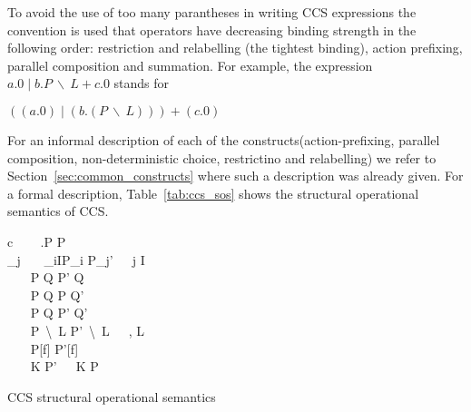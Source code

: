 	To avoid the use of too many parantheses in writing CCS expressions 
	the convention is used that operators have decreasing binding strength in 
	the following order: restriction and relabelling (the tightest binding), 
	action prefixing, parallel composition and summation. For example, the 
	expression $a.0 \mid b.P\ \backslash\ L + c.0$ stands for
		
	\begin{center}$((a.0) \mid (b.(P\ \backslash\ L))) + (c.0)$\end{center}
		
	For an informal description of each of the constructs(action-prefixing, 
	parallel composition, non-deterministic choice, restrictino and relabelling) 
	we refer to Section~\ref{sec:common_constructs} where such a description was 
	already given. For a formal description, Table~\ref{tab:ccs_sos} shows the 
	structural operational semantics of CCS.


\begin{table}[t]
\begin{ARRAY}{c}
	\ \ \ \Inference{                              }
	                            {\alpha.P \infarrow{\alpha} P} \vspace{10pt}\\
	_j\ \ \ 
	                              {\sum_{i\in I}P_i \infarrow{\alpha} P_j'}\ \ \ j \in I\vspace{10pt}\\
	\ \ \ 
	                             {P \mid Q \infarrow{\alpha} P' \mid Q} \vspace{10pt}\\
	\ \ \ 
	                             {P \mid Q \infarrow{\alpha} P \mid Q'} \vspace{10pt}\\
	\ \ \ 
	                             {P \mid Q \infarrow{\tau} P' \mid Q'} \vspace{10pt}\\
	\ \ \ 
	                              {P\ \backslash\ L \infarrow{\alpha} P'\  \backslash\ L}\ \ \ \alpha, \overline{\alpha} \notin L\vspace{10pt}\\
	\ \ \ 
	                             {P[f]  P'[f]} \vspace{10pt}\\
	\ \ \ 
	                             {K \infarrow{\alpha} P'}\ \ \ K  P

\end{ARRAY}
\caption{CCS structural operational semantics}
\label{tab:ccs_sos}
\end{table}

